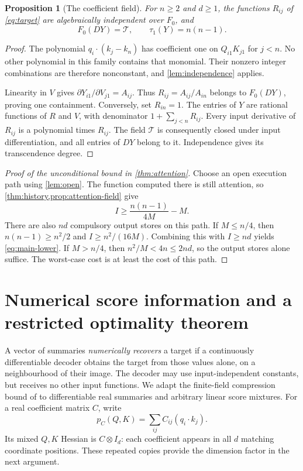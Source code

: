 \documentclass[11pt]{article}
\newtheorem{proposition}[proposition]{Proposition}
\theoremstyle{definition}
\theoremstyle{remark}
\newcommand{\cT}{\mathcal T}
\begin{document}
\begin{proposition}[The coefficient field]
\label{prop:attention-field}
For $n\ge2$ and $d\ge1$, the functions $R_{ij}$ of
\cref{eq:target} are algebraically independent over $F_0$, and
\begin{equation}
 F_0(DY)=\cT,\qquad \tau_1(Y)=n(n-1).
 \label{eq:attention-field}
\end{equation}
\end{proposition}
\begin{proof}
The polynomial $q_i\cdot(k_j-k_n)$ has coefficient one on
$Q_{i1}K_{j1}$ for $j<n$. No other polynomial in this family contains
that monomial. Their nonzero integer combinations are therefore
nonconstant, and \cref{lem:independence} applies.

Linearity in $V$ gives $\partial Y_{i1}/\partial V_{j1}=A_{ij}$.
Thus $R_{ij}=A_{ij}/A_{in}$ belongs to $F_0(DY)$, proving one
containment. Conversely, set $R_{in}=1$. The entries of $Y$ are rational
functions of $R$ and $V$, with denominator $1+\sum_{j<n}R_{ij}$.
Every input derivative of $R_{ij}$ is a polynomial times $R_{ij}$.
The field $\cT$ is consequently closed under input differentiation,
and all entries of $DY$ belong to it. Independence gives its
transcendence degree.
\end{proof}

\begin{proof}[Proof of the unconditional bound in \cref{thm:attention}]
Choose an open execution path using \cref{lem:open}. The function
computed there is still attention, so \cref{thm:history,prop:attention-field}
give
\[
 I\ge\frac{n(n-1)}{4M}-M.
\]
There are also $nd$ compulsory output stores on this path. If
$M\le n/4$, then $n(n-1)\ge n^2/2$ and
$I\ge n^2/(16M)$. Combining this with $I\ge nd$ yields
\cref{eq:main-lower}. If $M>n/4$, then $n^2/M<4n\le2nd$,
so the output stores alone suffice. The worst-case cost is at least
the cost of this path.
\end{proof}

\section{Numerical score information and a restricted optimality theorem}
\label{app:recovery}
A vector of summaries \emph{numerically recovers} a target if a
continuously differentiable decoder obtains the target from those
values alone, on a neighbourhood of their image. The decoder may use
input-independent constants, but receives no other input functions.
We adapt the finite-field compression bound of
\cite[Lemma~4.6]{sahaye2024} to differentiable real summaries and
arbitrary linear score mixtures.
For a real coefficient matrix $C$, write
\[
 p_C(Q,K)=\sum_{ij}C_{ij}(q_i\cdot k_j).
\]
Its mixed $Q,K$ Hessian is $C\otimes I_d$: each coefficient appears
in all $d$ matching coordinate positions. These repeated copies
provide the dimension factor in the next argument.
\end{document}
